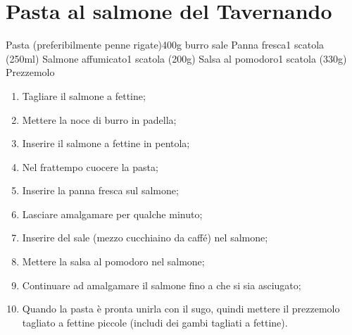 \section{Pasta al salmone del Tavernando}

\generalRecipeInfos{}

\ingredienti%
    {Pasta (preferibilmente penne rigate)}{400g}%
    {burro}{\qb{}}%
    {sale}{\qb{}}%
    {Panna fresca}{1 scatola (250ml)}%
    {Salmone affumicato}{1 scatola (200g)}%
    {Salsa al pomodoro}{1 scatola (330g)}%
    {Prezzemolo}{\qb{}}%

\begin{enumerate}
    \item Tagliare il salmone a fettine;
    \item Mettere la noce di burro in padella;
    \item Inserire il salmone a fettine in pentola;
    \item Nel frattempo cuocere la pasta;
    \item Inserire la panna fresca sul salmone;
    \item Lasciare amalgamare per qualche minuto;
    \item Inserire del sale (mezzo cucchiaino da caffé) nel salmone;
    \item Mettere la salsa al pomodoro nel salmone;
    \item Continuare ad amalgamare il salmone fino a che si sia asciugato;
    \item Quando la pasta è pronta unirla con il sugo, quindi mettere il prezzemolo tagliato a fettine piccole (includi dei gambi tagliati a fettine).
\end{enumerate}

